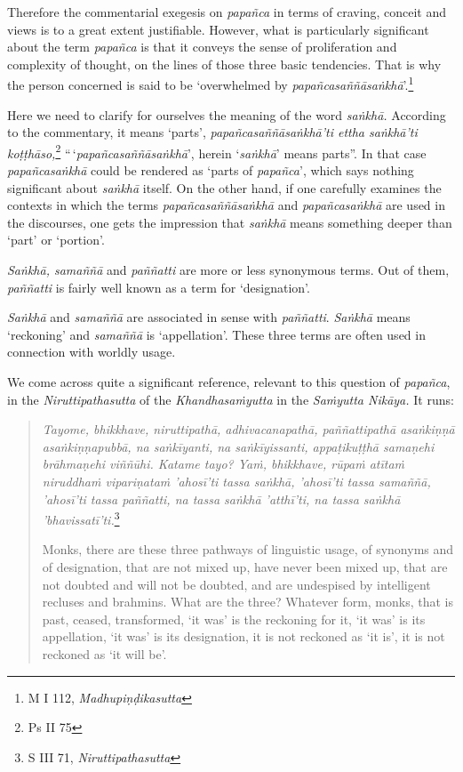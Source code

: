 Therefore the commentarial exegesis on \emph{papañca} in terms of craving, conceit and views is to a great extent justifiable. However, what is particularly significant about the term \emph{papañca} is that it conveys the sense of proliferation and complexity of thought, on the lines of those three basic tendencies. That is why the person concerned is said to be `overwhelmed by \emph{papañcasaññāsaṅkhā}'.\footnote{M I 112, \emph{Madhupiṇḍikasutta}}

Here we need to clarify for ourselves the meaning of the word \emph{saṅkhā.} According to the commentary, it means `parts', \emph{papañcasaññāsaṅkhā'ti ettha saṅkhā'ti koṭṭhāso,}\footnote{Ps II 75} ``\,`\emph{papañcasaññāsaṅkhā}', herein `\emph{saṅkhā}' means parts''. In that case \emph{papañcasaṅkhā} could be rendered as `parts of \emph{papañca}', which says nothing significant about \emph{saṅkhā} itself. On the other hand, if one carefully examines the contexts in which the terms \emph{papañcasaññāsaṅkhā} and \emph{papañcasaṅkhā} are used in the discourses, one gets the impression that \emph{saṅkhā} means something deeper than `part' or `portion'.

\emph{Saṅkhā, samaññā} and \emph{paññatti} are more or less synonymous terms. Out of them, \emph{paññatti} is fairly well known as a term for `designation'.

\emph{Saṅkhā} and \emph{samaññā} are associated in sense with \emph{paññatti}. \emph{Saṅkhā} means `reckoning' and \emph{samaññā} is `appellation'. These three terms are often used in connection with worldly usage.

We come across quite a significant reference, relevant to this question of \emph{papañca}, in the \emph{Niruttipathasutta} of the \emph{Khandhasaṁyutta} in the \emph{Saṁyutta Nikāya.} It runs:

\begin{quote}
\emph{Tayome, bhikkhave, niruttipathā, adhivacanapathā, paññattipathā asaṅkiṇṇā asaṅkiṇṇapubbā, na saṅkīyanti, na saṅkīyissanti, appaṭikuṭṭhā samaṇehi brāhmaṇehi viññūhi. Katame tayo? Yaṁ, bhikkhave, rūpaṁ atītaṁ niruddhaṁ vipariṇataṁ 'ahosī'ti tassa saṅkhā, 'ahosī'ti tassa samaññā, 'ahosī'ti tassa paññatti, na tassa saṅkhā 'atthī'ti, na tassa saṅkhā 'bhavissatī'ti.}\footnote{S III 71, \emph{Niruttipathasutta}}

Monks, there are these three pathways of linguistic usage, of synonyms and of designation, that are not mixed up, have never been mixed up, that are not doubted and will not be doubted, and are undespised by intelligent recluses and brahmins. What are the three? Whatever form, monks, that is past, ceased, transformed, `it was' is the reckoning for it, `it was' is its appellation, `it was' is its designation, it is not reckoned as `it is', it is not reckoned as `it will be'.
\end{quote}


